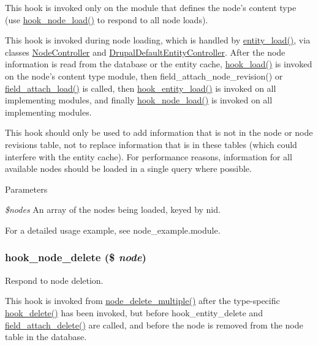 This hook is invoked only on the module that defines the node's content type (use \hyperlink{group__node__api__hooks_gad48bb14b68ed38526029d1f7ac2d2de4}{hook\_\-node\_\-load()} to respond to all node loads).

This hook is invoked during node loading, which is handled by \hyperlink{common_8inc_a78b89cf93f9710a68d02f86adccf1898}{entity\_\-load()}, via classes \hyperlink{classNodeController}{NodeController} and \hyperlink{classDrupalDefaultEntityController}{DrupalDefaultEntityController}. After the node information is read from the database or the entity cache, \hyperlink{group__node__api__hooks_ga49065b040d7fb3e02889eda6361dac34}{hook\_\-load()} is invoked on the node's content type module, then field\_\-attach\_\-node\_\-revision() or \hyperlink{group__field__attach_ga1e92543395961c912eb293b50e991586}{field\_\-attach\_\-load()} is called, then \hyperlink{group__hooks_ga1f594647c8cbb27f75b77cc4118da8d6}{hook\_\-entity\_\-load()} is invoked on all implementing modules, and finally \hyperlink{group__node__api__hooks_gad48bb14b68ed38526029d1f7ac2d2de4}{hook\_\-node\_\-load()} is invoked on all implementing modules.

This hook should only be used to add information that is not in the node or node revisions table, not to replace information that is in these tables (which could interfere with the entity cache). For performance reasons, information for all available nodes should be loaded in a single query where possible.


\begin{DoxyParams}{Parameters}
\item[{\em \$nodes}]An array of the nodes being loaded, keyed by nid.\end{DoxyParams}
For a detailed usage example, see node\_\-example.module. \hypertarget{group__node__api__hooks_ga66ea0473a9950dc961802e801e5042e9}{
\subsubsection[{hook\_\-node\_\-delete}]{\setlength{\rightskip}{0pt plus 5cm}hook\_\-node\_\-delete (\$ {\em node})}}
\label{group__node__api__hooks_ga66ea0473a9950dc961802e801e5042e9}
Respond to node deletion.

This hook is invoked from \hyperlink{node_8module_ab7b4bed8dc18cfa2d8e1839b0429effa}{node\_\-delete\_\-multiple()} after the type-\/specific \hyperlink{group__node__api__hooks_ga8588d8a814e8aef059d9e0f842904b35}{hook\_\-delete()} has been invoked, but before hook\_\-entity\_\-delete and \hyperlink{group__field__attach_gac2e3658c9c02d0d0e71359f9ef2f207a}{field\_\-attach\_\-delete()} are called, and before the node is removed from the node table in the database.


